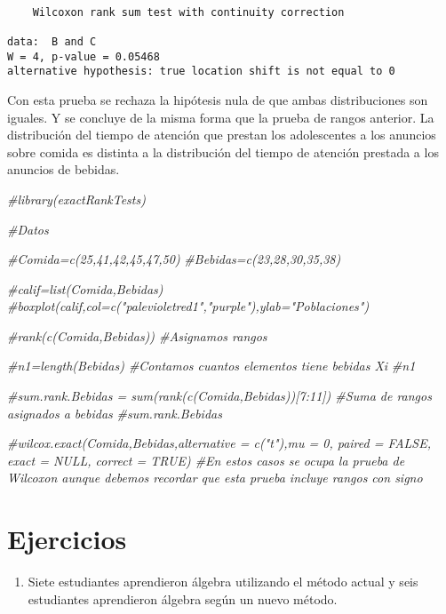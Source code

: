 \documentclass[a4paper,oneside,openany]{book}
\newenvironment{Shaded}{\begin{snugshade}}{\end{snugshade}}
\newcommand{\CommentTok}[1]{\textcolor[rgb]{0.56,0.35,0.01}{\textit{#1}}}
\providecommand{\tightlist}{%
  \setlength{\itemsep}{0pt}\setlength{\parskip}{0pt}}
\begin{document}
\begin{verbatim}

    Wilcoxon rank sum test with continuity correction

data:  B and C
W = 4, p-value = 0.05468
alternative hypothesis: true location shift is not equal to 0
\end{verbatim}

Con esta prueba se rechaza la hipótesis nula de que ambas distribuciones
son iguales. Y se concluye de la misma forma que la prueba de rangos
anterior. La distribución del tiempo de atención que prestan los
adolescentes a los anuncios sobre comida es distinta a la distribución
del tiempo de atención prestada a los anuncios de bebidas.

\begin{Shaded}
\begin{Highlighting}[]
\CommentTok{#library(exactRankTests)}

\CommentTok{#Datos}

\CommentTok{#Comida=c(25,41,42,45,47,50)                                                            }
\CommentTok{#Bebidas=c(23,28,30,35,38)}


\CommentTok{#calif=list(Comida,Bebidas)}
\CommentTok{#boxplot(calif,col=c("palevioletred1","purple"),ylab="Poblaciones")}

\CommentTok{#rank(c(Comida,Bebidas))  #Asignamos rangos}

\CommentTok{#n1=length(Bebidas)       #Contamos cuantos elementos tiene bebidas Xi}
\CommentTok{#n1}

\CommentTok{#sum.rank.Bebidas = sum(rank(c(Comida,Bebidas))[7:11]) #Suma de rangos asignados a bebidas}
\CommentTok{#sum.rank.Bebidas}

\CommentTok{#wilcox.exact(Comida,Bebidas,alternative = c("t"),mu = 0, paired = FALSE, exact = NULL, correct = TRUE)  #En estos casos se ocupa la prueba de Wilcoxon aunque debemos recordar que esta prueba incluye rangos con signo}
\end{Highlighting}
\end{Shaded}

\section{Ejercicios}\label{ejercicios-5}

\begin{enumerate}
\def\labelenumi{\arabic{enumi}.}
\tightlist
\item
  Siete estudiantes aprendieron álgebra utilizando el método actual y
  seis estudiantes aprendieron álgebra según un nuevo método.
\end{enumerate}
\end{document}
